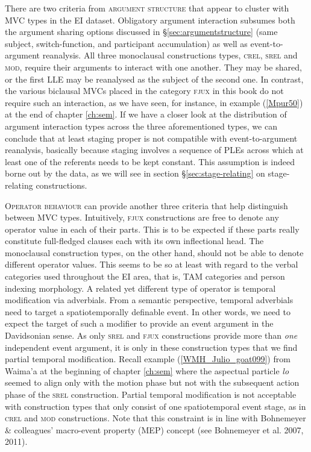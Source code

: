 There are two criteria from \textsc{argument structure} that appear to cluster with MVC types in the EI dataset. Obligatory argument interaction subsumes both the argument sharing options discussed in §\ref{sec:argumentstructure} (same subject, switch-function, and participant accumulation) as well as event-to-argument reanalysis. All three monoclausal constructions types, \textsc{crel}, \textsc{srel} and \textsc{mod}, require their arguments to interact with one another. They may be shared, or the first LLE may be reanalysed as the subject of the second one. In contrast, the various biclausal MVCs placed in the category \textsc{fjux} in this book do not require such an interaction, as we have seen, for instance, in example (\ref{Mpur50}) at the end of chapter \ref{ch:sem}. If we have a closer look at the distribution of argument interaction types across the three aforementioned types, we can conclude that at least staging proper is not compatible with event-to-argument reanalysis, basically because staging involves a sequence of PLEs across which at least one of the referents needs to be kept constant. This assumption is indeed borne out by the data, as we will see in section §\ref{sec:stage-relating} on stage-relating constructions.

\textsc{Operator behaviour} can provide another three criteria that help distinguish between MVC types. Intuitively, \textsc{fjux} constructions are free to denote any operator value in each of their parts. This is to be expected if these parts really constitute full-fledged clauses each with its own inflectional head. The monoclausal construction types, on the other hand, should not be able to denote different operator values. This seems to be so at least with regard to the verbal categories used throughout the EI area, that is, TAM categories and person indexing morphology. A related yet different type of operator is temporal modification via adverbials. From a semantic perspective, temporal adverbials need to target a spatiotemporally definable event. In other words, we need to expect the target of such a modifier to provide an event argument in the Davidsonian sense. As only \textsc{srel} and \textsc{fjux} constructions provide more than \emph{one} independent event argument, it is only in these construction types that we find partial temporal modification. Recall example (\ref{WMH_Julio_goat099}) from Waima'a at the beginning of chapter \ref{ch:sem} where the aspectual particle \textit{lo} seemed to align only with the motion phase but not with the subsequent action phase of the \textsc{srel} construction. Partial temporal modification is not acceptable with construction types that only consist of one spatiotemporal event stage, as in \textsc{crel} and \textsc{mod} constructions. Note that this constraint is in line with Bohnemeyer \& colleagues' macro-event property (MEP) concept (see Bohnemeyer et al. 2007, 2011).


